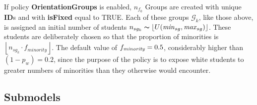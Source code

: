 If policy \textbf{OrientationGroups} is enabled, $n_{f_0}$ Groups are
created with unique \textbf{ID}s and with \textbf{isFixed} equal to TRUE. Each
of these groups $\mathcal{G}_k$, like those above, is assigned an initial
number of students $n_{sg_k} \thicksim \left\lfloor
U(\text{\textit{min}}_{sg},\text{\textit{max}}_{sg}) \right\rfloor$. These
students are deliberately chosen so that the proportion of minorities is
$\left\lfloor n_{sg_k} \cdot f_{\textit{minority}} \right \rfloor$. The
default value of $f_{\text{\textit{minority}}}=0.5$, considerably higher than
$(1-p_w)=0.2$, since the purpose of the policy is to expose white students to
greater numbers of minorities than they otherwise would encounter.


\subsection{Submodels}

